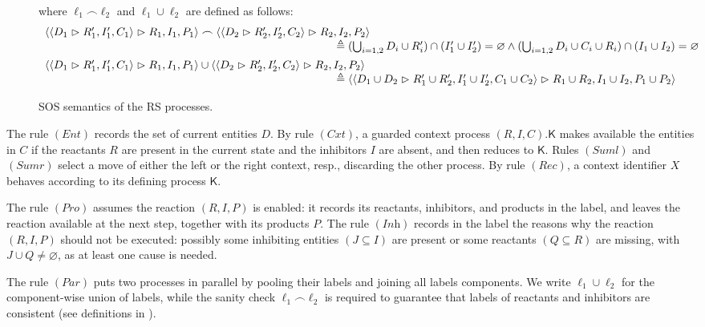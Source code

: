 \begin{figure*}[t]
\medskip	
\noindent
{\footnotesize
		where $\ell_1 \frown \ell_2$ and $\ell_1 \cup \ell_2$ are defined as follows:
		$$\begin{array}{l}
\langle \langle D_1\vartriangleright R'_1,I'_1,C_1\rangle\vartriangleright R_1,I_1,P_1\rangle
\frown
\langle \langle D_2\vartriangleright R'_2,I'_2,C_2\rangle\vartriangleright R_2,I_2,P_2\rangle
\\
\qquad\qquad\qquad\qquad\qquad\qquad\qquad\qquad\qquad\qquad\qquad\qquad\qquad
\triangleq (\textstyle\bigcup_{i=1,2} D_i\cup  R'_i) \cap (I'_1 \cup I'_2) = \varnothing
\wedge
(\bigcup_{i=1,2} D_i\cup  C_i\cup  R_i) \cap (I_1 \cup I_2) = \varnothing \\[5pt]
\langle \langle D_1\vartriangleright R'_1,I'_1,C_1\rangle\vartriangleright R_1,I_1,P_1\rangle
\cup
\langle \langle D_2\vartriangleright R'_2,I'_2,C_2\rangle\vartriangleright R_2,I_2,P_2\rangle
\\
\qquad\qquad\qquad\qquad\qquad\qquad\qquad\qquad\qquad\qquad\qquad\qquad\qquad
\triangleq \langle \langle D_1\cup D_2\vartriangleright R'_1\cup R'_2,I'_1\cup I'_2,C_1\cup C_2\rangle\vartriangleright R_1\cup R_2,I_1\cup I_2,P_1\cup P_2\rangle
\end{array}$$
}
		\caption{SOS semantics of the RS processes.}
		\label{fig:guardforRS2nd}
\end{figure*}


The rule $(\textit{Ent})$ records the set of current entities $D$.
By rule $(\textit{Cxt})$, a guarded context process $(R,I,C).\mathsf{K}$ makes available the entities in $C$ if the reactants $R$ are present in the current state and the inhibitors $I$ are absent, and then reduces to $\mathsf{K}$. 
Rules $(\textit{Suml})$ and $(\textit{Sumr})$ select a move of either the left or the right context, resp., discarding the other process.
By rule $(\textit{Rec})$, a context identifier $X$ behaves according to its defining process $\mathsf{K}$.

The rule $(\textit{Pro})$ assumes the reaction $(R,I,P)$ is enabled: it records its reactants, inhibitors, and products in the label, and leaves the reaction  available at the next step, together with its products $P$.
The rule $(\textit{Inh})$ records in the label the reasons why the reaction $(R,I,P)$ should not be executed: possibly some inhibiting entities $(J \subseteq I)$ are present or some reactants $(Q \subseteq R)$ are missing, with $J \cup Q \neq \varnothing$, as at least one cause is needed.

The rule $(\textit{Par})$ puts two processes in parallel by pooling their labels and joining all labels components. We write $\ell_1\cup\ell_2$ for the component-wise union of labels, while the sanity check $\ell_1\frown\ell_2$ is required to guarantee that labels of reactants and inhibitors are consistent (see definitions in ).

